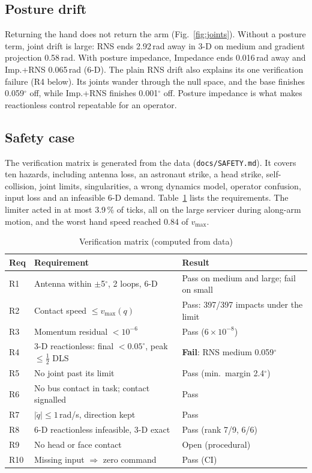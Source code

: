 \documentclass[conference]{IEEEtran}
\newcommand{\qd}{\dot{q}}
\begin{document}
\subsection{Posture drift}
Returning the hand does not return the arm (Fig.~\ref{fig:joints}). Without a posture term, joint drift is
large: RNS ends 2.92\,rad away in 3-D on medium and gradient projection 0.58\,rad. With posture
impedance, Impedance ends 0.016\,rad away and Imp.+RNS 0.065\,rad (6-D). The plain RNS drift also explains
its one verification failure (R4 below). Its joints wander through the null space, and the base finishes
0.059$^\circ$ off, while Imp.+RNS finishes 0.001$^\circ$ off. Posture impedance is what makes reactionless
control repeatable for an operator.

\subsection{Safety case}
The verification matrix is generated from the data (\texttt{docs/SAFETY.md}). It covers ten hazards, including
antenna loss, an astronaut strike, a head strike, self-collision, joint limits, singularities, a wrong
dynamics model, operator confusion, input loss and an infeasible 6-D demand. Table~\ref{tab:verify} lists
the requirements. The limiter acted in at most 3.9\,\% of ticks, all on the large servicer during
along-arm motion, and the worst hand speed reached 0.84 of $v_{\max}$.

\begin{table}[t]\caption{Verification matrix (computed from data)}\label{tab:verify}
\centering\small\setlength{\tabcolsep}{3pt}
\begin{tabular}{p{}p{}p{}}\toprule
Req & Requirement & Result\\\midrule
R1 & Antenna within $\pm$5$^\circ$, 2 loops, 6-D & Pass on medium and large; fail on small\\
R2 & Contact speed $\le v_{\max}(q)$ & Pass: 397/397 impacts under the limit\\
R3 & Momentum residual $<10^{-6}$ & Pass ($6\times10^{-8}$)\\
R4 & 3-D reactionless: final $<0.05^\circ$, peak $\le\frac12$ DLS & \textbf{Fail}: RNS medium 0.059$^\circ$\\
R5 & No joint past its limit & Pass (min.\ margin 2.4$^\circ$)\\
R6 & No bus contact in task; contact signalled & Pass\\
R7 & $|\qd|\le1$\,rad/s, direction kept & Pass\\
R8 & 6-D reactionless infeasible, 3-D exact & Pass (rank 7/9, 6/6)\\
R9 & No head or face contact & Open (procedural)\\
R10 & Missing input $\Rightarrow$ zero command & Pass (CI)\\\bottomrule
\end{tabular}\end{table}
\end{document}
